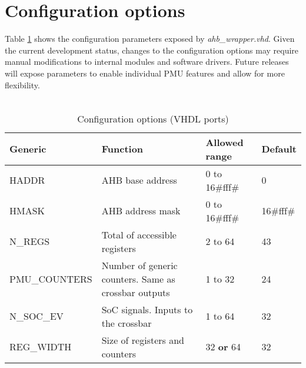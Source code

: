 \section{Configuration options}
\label{chapter 4}
Table \ref{generics} shows the configuration parameters exposed by \textit{ahb\_wrapper.vhd}. Given the current development status, changes to the configuration options may require manual modifications to internal modules and software drivers. Future releases will expose parameters to enable individual PMU features and allow for more flexibility.\\
\\
\begin{table}[H]
	\caption{Configuration options (VHDL ports)}
	\label{generics}
	\centering
	\begin{small}
		\begin{tabular}{|l|l|l|l|}
			\hline
			\textbf{Generic} & \textbf{Function}  & \textbf{Allowed range}  & \textbf{Default}\\
			\hline
			HADDR & AHB base address &0 to 16\#fff\# & 0\\
			\hline
			HMASK & AHB address mask &0 to 16\#fff\# & 16\#fff\#\\
			\hline
			N\_REGS & Total of accessible registers & 2 to 64 & 43\\
			\hline
			PMU\_COUNTERS & Number of generic counters. Same as crossbar outputs& 1 to 32 &24 \\
			\hline
			N\_SOC\_EV &SoC signals. Inputs to the crossbar& 1 to 64 & 32 \\
			\hline
			REG\_WIDTH &Size of registers and counters & 32 \textbf{or} 64 & 32 \\
			\hline
		
		\end{tabular}
	\end{small}
\end{table}
